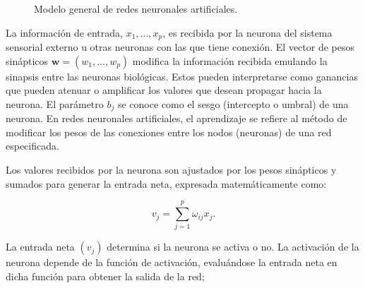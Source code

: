 \documentclass[
  us-letterpaper,
]{scrreprt}
\theoremstyle{plain}
\theoremstyle{definition}
\theoremstyle{definition}
\theoremstyle{plain}
\theoremstyle{remark}
\begin{document}
\begin{figure}


\caption{\label{fig-modelogen}Modelo general de redes neuronales
artificiales.}

\end{figure}%

La información de entrada, \(x_1, ..., x_p\), es recibida por la neurona
del sistema sensorial externo u otras neuronas con las que tiene
conexión. El vector de pesos sinápticos \(\mathbf{w} = (w_1, ..., w_p)\)
modifica la información recibida emulando la sinapsis entre las neuronas
biológicas. Estos pueden interpretarse como ganancias que pueden atenuar
o amplificar los valores que desean propagar hacia la neurona. El
parámetro \(b_j\) se conoce como el sesgo (intercepto o umbral) de una
neurona. En redes neuronales artificiales, el aprendizaje se refiere al
método de modificar los pesos de las conexiones entre los nodos
(neuronas) de una red especificada.

Los valores recibidos por la neurona son ajustados por los pesos
sinápticos y sumados para generar la entrada neta, expresada
matemáticamente como:

\[v_j=\sum_{j=1}^p \omega_{ij}x_j.\]

La entrada neta \((v_j)\) determina si la neurona se activa o no. La
activación de la neurona depende de la función de activación,
evaluándose la entrada neta en dicha función para obtener la salida de
la red;
\end{document}
